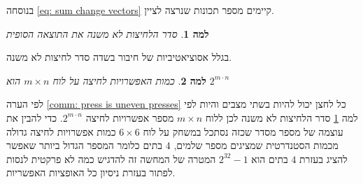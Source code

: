 \documentclass[12pt,leqno]{article}
\newtheorem{lemma}{למה}[section]
\begin{document}
בנוסחה
\ref{eq: sum change vectors}
קיימים מספר תכונות 
שנרצה לציין.
\begin{lemma}
    \label{lemma: order presses}
    סדר הלחיצות לא משנה את התוצאה הסופית
\end{lemma}
בגלל אסוציאטיביות של חיבור בשדה 
סדר לחיצות לא משנה.
\begin{lemma}
    \label{lemma: num presses}
    כמות האפשרויות לחיצה על לוח
    $m \times n$
    הוא 
    $2^{m \cdot n}$
\end{lemma}
לפי הערה 
\ref{comm: press is uneven presses}
כל לחצן יכול להיות בשתי מצבים 
והיות לפי
למה
\ref{lemma: order presses}
סדר הלחיצות לא משנה 
לכן ללוח
$m \times n$
מספר אפשרויות לחיצה 
$2^{m \cdot n}$.
כדי להבין את עוצמה של מספר מסדר שכזה נסתכל במשחק על לוח 
$6 \times 6$
כמות  אפשרויות לחיצה גדולה 
מכמות הסטנדרטית שמציגים מספר שלמים,
$4$
בתים
כלומר המספר הגדול ביותר שאפשר להציג  בעזרת 
$4$
בתים
הוא
$2^{32}-1$
המטרה של המחשה זה להדגיש כמה לא פרקטית לנסות לפתור בעזרת
ניסיון כל האופציות האפשריות.
\end{document}
